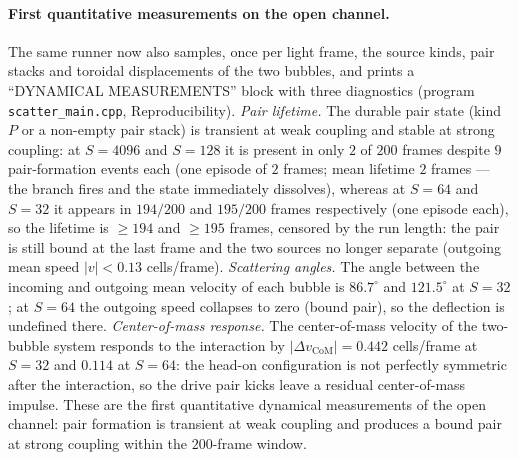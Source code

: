 \documentclass{ijuc}
\begin{document}
\paragraph{First quantitative measurements on the open channel.}  The same runner now also samples, once per light frame, the source kinds, pair stacks and toroidal displacements of the two bubbles, and prints a ``DYNAMICAL MEASUREMENTS'' block with three diagnostics (program \texttt{scatter\_main.cpp}, Reproducibility).  \emph{Pair lifetime.}  The durable pair state (kind $P$ or a non-empty pair stack) is transient at weak coupling and stable at strong coupling: at $S=4096$ and $S=128$ it is present in only $2$ of $200$ frames despite $9$ pair-formation events each (one episode of $2$ frames; mean lifetime $2$ frames --- the branch fires and the state immediately dissolves), whereas at $S=64$ and $S=32$ it appears in $194/200$ and $195/200$ frames respectively (one episode each), so the lifetime is $\ge194$ and $\ge195$ frames, censored by the run length: the pair is still bound at the last frame and the two sources no longer separate (outgoing mean speed $|v|<0.13$ cells/frame).  \emph{Scattering angles.}  The angle between the incoming and outgoing mean velocity of each bubble is $86.7^{\circ}$ and $121.5^{\circ}$ at $S=32$; at $S=64$ the outgoing speed collapses to zero (bound pair), so the deflection is undefined there.  \emph{Center-of-mass response.}  The center-of-mass velocity of the two-bubble system responds to the interaction by $|\Delta v_{\mathrm{CoM}}|=0.442$ cells/frame at $S=32$ and $0.114$ at $S=64$: the head-on configuration is not perfectly symmetric after the interaction, so the drive pair kicks leave a residual center-of-mass impulse.  These are the first quantitative dynamical measurements of the open channel: pair formation is transient at weak coupling and produces a bound pair at strong coupling within the $200$-frame window.
\end{document}
